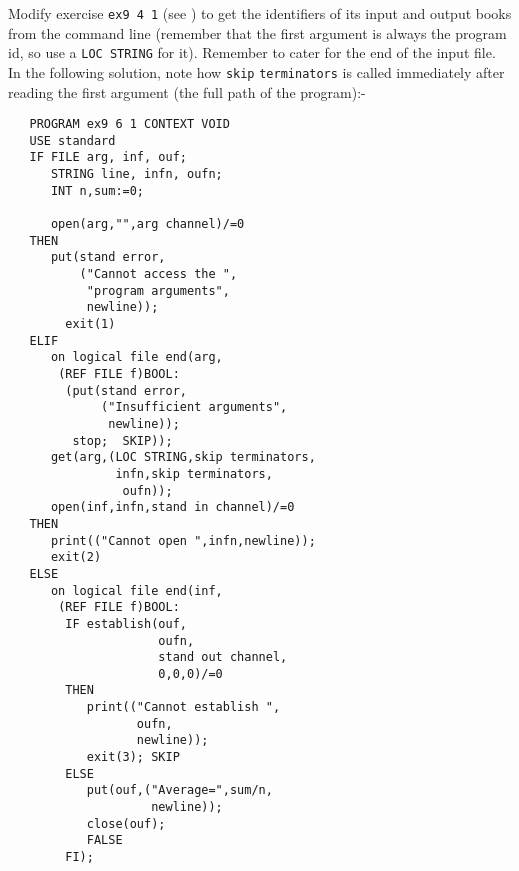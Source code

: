 \begin{exercise}
\item Modify exercise \verb|ex9 4 1| (see ) to
get the identifiers of its input and output books from the command
line (remember that the first argument is always the program id, so
use a \verb|LOC STRING| for it).  Remember to cater for the end of
the input file. \ans In the following solution, note how
\texttt{skip} \texttt{term\-in\-ators} is called immediately after
reading the first argument (the full path of the program):-
\begin{verbatim}
   PROGRAM ex9 6 1 CONTEXT VOID
   USE standard
   IF FILE arg, inf, ouf;
      STRING line, infn, oufn;
      INT n,sum:=0;

      open(arg,"",arg channel)/=0
   THEN
      put(stand error,
          ("Cannot access the ",
           "program arguments",
           newline));
        exit(1)
   ELIF
      on logical file end(arg,
       (REF FILE f)BOOL:
        (put(stand error,
             ("Insufficient arguments",
              newline));
         stop;  SKIP));
      get(arg,(LOC STRING,skip terminators,
               infn,skip terminators,
                oufn));
      open(inf,infn,stand in channel)/=0
   THEN
      print(("Cannot open ",infn,newline));
      exit(2)
   ELSE
      on logical file end(inf,
       (REF FILE f)BOOL:
        IF establish(ouf,
                     oufn,
                     stand out channel,
                     0,0,0)/=0
        THEN
           print(("Cannot establish ",
                  oufn,
                  newline));
           exit(3); SKIP
        ELSE
           put(ouf,("Average=",sum/n,
                    newline));
           close(ouf);
           FALSE
        FI);


\end{verbatim}
\end{exercise}
